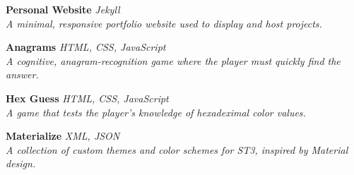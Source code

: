\documentclass[line,margin]{res}
\begin{document}
\begin{resume}
          \textbf{Personal Website} \sl Jekyll \\
          A minimal, responsive portfolio website used to display and host projects. \vspace{-2mm}

          \textbf{Anagrams} \sl HTML, CSS, JavaScript \\
          A cognitive, anagram-recognition game where the player must quickly find the answer. \vspace{-6mm}

          \textbf{Hex Guess} \sl HTML, CSS, JavaScript \\
          A game that tests the player's knowledge of hexadeximal color values. \vspace{-2mm}

          \textbf{Materialize} \sl XML, JSON \\
          A collection of custom themes and color schemes for ST3, inspired by Material design.

    \end{resume}
\end{document}
